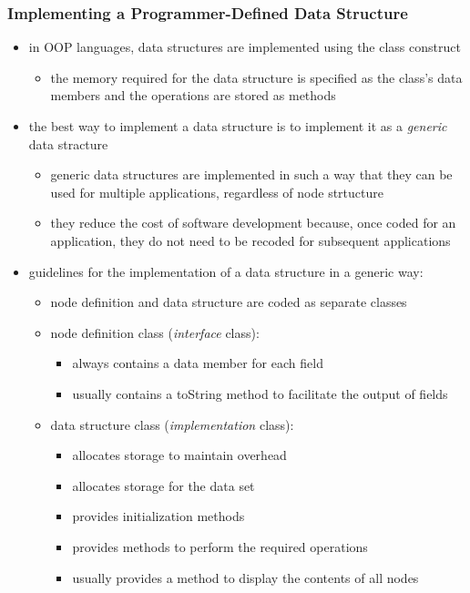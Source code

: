 \documentclass[11pt]{article}
\begin{document}
\subsubsection{Implementing a Programmer-Defined Data Structure}
\label{sec:org73b0ef0}
\begin{itemize}
\item in OOP languages, data structures are implemented using the class construct
\begin{itemize}
\item the memory required for the data structure is specified as the class's data members and the operations are stored as methods
\end{itemize}
\item the best way to implement a data structure is to implement it as a \emph{generic} data stracture
\begin{itemize}
\item generic data structures are implemented in such a way that they can be used for multiple applications, regardless of node strtucture
\item they reduce the cost of software development because, once coded for an application, they do not need to be recoded for subsequent applications
\end{itemize}
\item guidelines for the implementation of a data structure in a generic way:
\begin{itemize}
\item node definition and data structure are coded as separate classes
\item node definition class (\emph{interface} class):
\begin{itemize}
\item always contains a data member for each field
\item usually contains a toString method to facilitate the output of fields
\end{itemize}
\item data structure class (\emph{implementation} class):
\begin{itemize}
\item allocates storage to maintain overhead
\item allocates storage for the data set
\item provides initialization methods
\item provides methods to perform the required operations
\item usually provides a method to display the contents of all nodes
\end{itemize}
\end{itemize}
\end{itemize}
\end{document}
